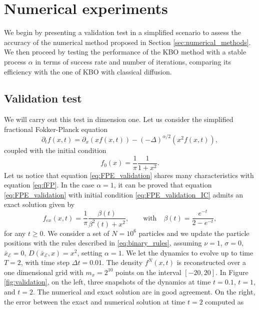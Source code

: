 \documentclass[11pt,handout]{article}%
\numberwithin{equation}{section}
\theoremstyle{definition}
\begin{document}
\section{Numerical experiments}\label{sec:numerical_experiments} 
We begin by presenting a validation test in a simplified scenario to assess the accuracy of the numerical method proposed in Section \ref{sec:numerical_methods}. We then proceed by testing the performance of the KBO method with a stable process $\alpha$ in terms of success rate and number of iterations, comparing its efficiency with the one of KBO with classical diffusion. 
\subsection{Validation test}
We will carry out this test in dimension one. Let us consider the simplified fractional Fokker-Planck equation
\begin{equation}\label{eq:FPE_validation}
	\partial_t f(x,t) = \partial_x (x f(x,t)) - (-\Delta)^{\alpha/2} (x^2 f(x,t)),
\end{equation}
coupled with the initial condition 
\begin{equation}\label{eq:FPE_validation_IC}
	f_0(x) = \frac{1}{\pi}\frac{1}{1+x^2}. 
\end{equation}
Let us notice that equation \eqref{eq:FPE_validation} shares many characteristics with equation \eqref{eq:fFP}.
In the case $\alpha = 1$, it can be proved that equation \eqref{eq:FPE_validation} with initial condition \eqref{eq:FPE_validation_IC} admits an exact solution given by 
\begin{equation}\label{eq:FPE_validation_exact}
	f_{ex}(x,t) = \frac{1}{\pi}\frac{\beta(t)}{\beta^2(t) + x^2}, \qquad \text{with} \quad \beta(t) = \frac{e^{-t}}{2-e^{-t}},
\end{equation}
for any $t\geq 0$. We consider a set of $N=10^6$ particles and we update the particle positions with the rules described in \eqref{eq:binary_rules}, assuming $\nu=1$, $\sigma=0$, $\bar{x}_\mathcal{E} = 0$, $D(\bar{x}_\mathcal{E},x) = x^2$, setting $\alpha = 1$. We let the dynamics to evolve up to time $T=2$, with time step $\Delta t = 0.01$. The density $f^N(x,t)$ is reconstructed over a one dimensional grid with $m_x=2^{10}$ points on the interval $[-20,20]$. In Figure \ref{fig:validation}, on the left, three snapshots of the dynamics at time $t=0.1$, $t=1$, and $t=2$.  The numerical and exact solution are in good agreement. On the right, the error between the exact and numerical solution at time $t=2$ computed as 
\end{document}
